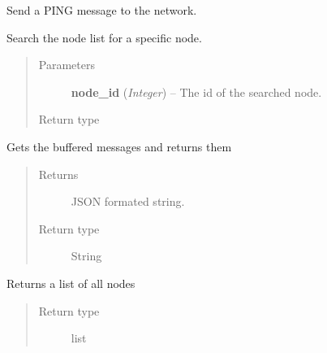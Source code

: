 \documentclass[letterpaper,10pt,english]{sphinxmanual}
\begin{document}
\begin{fulllineitems}
\begin{fulllineitems}
\label{swnp:swnp.SWNP.do_ping}
Send a PING message to the network.

\end{fulllineitems}


\begin{fulllineitems}
\label{swnp:swnp.SWNP.find_node}
Search the node list for a specific node.
\begin{quote}\begin{description}
\item[{Parameters}] \leavevmode
\textbf{node\_id} (\emph{Integer}) -- The id of the searched node.

\item[{Return type}] \leavevmode
{\hyperref[swnp:swnp.Node]{}}

\end{description}\end{quote}

\end{fulllineitems}


\begin{fulllineitems}
\label{swnp:swnp.SWNP.get_buffer}
Gets the buffered messages and returns them
\begin{quote}\begin{description}
\item[{Returns}] \leavevmode
JSON formated string.

\item[{Return type}] \leavevmode
String

\end{description}\end{quote}

\end{fulllineitems}


\begin{fulllineitems}
\label{swnp:swnp.SWNP.get_list}
Returns a list of all nodes
\begin{quote}\begin{description}
\item[{Return type}] \leavevmode
list


\end{description}
\end{quote}
\end{fulllineitems}
\end{fulllineitems}
\end{document}

